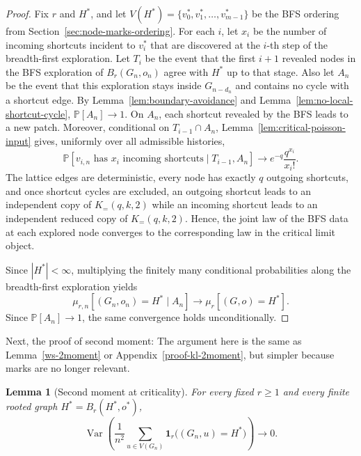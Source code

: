 \documentclass[10pt]{amsart}
\newtheorem{lemma}[theorem]{Lemma}
\begin{document}
\begin{proof}
Fix \(r\) and \(H^*\), and let
\(
V(H^*)=\{v_0^*,v_1^*,\dots,v_{m-1}^*\}
\)
be the BFS ordering from Section~\ref{sec:node-marks-ordering}. For each \(i\), let \(x_i\) be the number of incoming shortcuts incident
to \(v_i^*\) that are discovered at the \(i\)-th step of the breadth-first exploration. Let \(T_i\) be the event that the first \(i+1\) revealed nodes in the BFS exploration of \(B_r(G_n,o_n)\)
agree with \(H^*\) up to that stage. Also let \(A_n\) be the event that this exploration stays inside \(G_{n-d_n}\)
and contains no cycle with a shortcut edge. By Lemma~\ref{lem:boundary-avoidance} and Lemma~\ref{lem:no-local-shortcut-cycle},
\(
\mathbb P\left[A_n\right]\to 1.
\)
On \(A_n\), each shortcut revealed by the BFS leads to a new patch. Moreover, conditional on
\(T_{i-1}\cap A_n\), Lemma~\ref{lem:critical-poisson-input} gives, uniformly over all admissible histories,
\[
\mathbb P\left[v_{i,n}\text{ has }x_i\text{ incoming shortcuts}\mid T_{i-1},A_n\right]
\to e^{-q}\frac{q^{x_i}}{x_i!}.
\]
The lattice edges are deterministic, every node has exactly \(q\) outgoing shortcuts, and once shortcut
cycles are excluded, an outgoing shortcut leads to an independent copy of \(K_{=}(q,k,2)\) while an incoming
shortcut leads to an independent reduced copy of \(K_{=}(q,k,2)\). Hence, the joint law of the BFS data at
each explored node converges to the corresponding law in the critical limit object.

Since \(|H^*|<\infty\), multiplying the finitely many conditional probabilities along the breadth-first
exploration yields
\[
\mu_{r,n}\left[(G_n,o_n)=H^*\mid A_n\right]\to \mu_r\left[(G,o)=H^*\right].
\]
Since \(\mathbb P\left[A_n\right]\to 1\), the same convergence holds unconditionally.
\end{proof}

Next, the proof of second moment: The argument here is the same as Lemma~\ref{ws-2moment} or Appendix~\ref{proof-kl-2moment}, but simpler because marks are no longer relevant.

\begin{lemma}[Second moment at criticality]
For every fixed \(r\ge 1\) and every finite rooted graph \(H^*=B_r(H^*,o^*)\),
\[
\operatorname{Var}\!\left(\frac1{n^2}\sum_{u\in V(G_n)} \mathbf 1_r\big((G_n,u)=H^*\big)\right)\to 0.
\]
\end{lemma}
\end{document}
